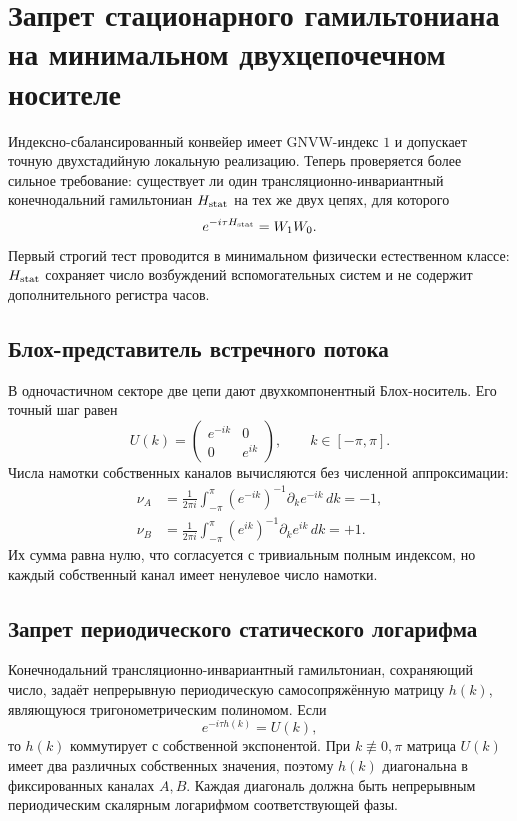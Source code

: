 \chapter{Запрет стационарного гамильтониана на минимальном двухцепочечном носителе}
\label{ch:v8-static-local-hamiltonian-embedding-no-go-gate}

Индексно-сбалансированный конвейер имеет GNVW-индекс $1$ и допускает
точную двухстадийную локальную реализацию. Теперь проверяется более сильное
требование: существует ли один трансляционно-инвариантный конечнодальний
гамильтониан $H_{\rm stat}$ на тех же двух цепях, для которого
\begin{equation}
 e^{-i\tau H_{\rm stat}}=W_1W_0.
\end{equation}
Первый строгий тест проводится в минимальном физически естественном классе:
$H_{\rm stat}$ сохраняет число возбуждений вспомогательных систем и не содержит
дополнительного регистра часов.

\section{Блох-представитель встречного потока}

В одночастичном секторе две цепи дают двухкомпонентный Блох-носитель. Его
точный шаг равен
\begin{equation}
 U(k)=\begin{pmatrix}e^{-ik}&0\\0&e^{ik}\end{pmatrix},
 \qquad k\in[-\pi,\pi].
\end{equation}
Числа намотки собственных каналов вычисляются без численной аппроксимации:
\begin{align}
 \nu_A&=\frac1{2\pi i}\int_{-\pi}^{\pi}
  (e^{-ik})^{-1}\partial_k e^{-ik}\,dk=-1,\\
 \nu_B&=\frac1{2\pi i}\int_{-\pi}^{\pi}
  (e^{ik})^{-1}\partial_k e^{ik}\,dk=+1.
\end{align}
Их сумма равна нулю, что согласуется с тривиальным полным индексом, но
каждый собственный канал имеет ненулевое число намотки.

\section{Запрет периодического статического логарифма}

Конечнодальний трансляционно-инвариантный гамильтониан, сохраняющий число, задаёт
непрерывную периодическую самосопряжённую матрицу $h(k)$, являющуюся
тригонометрическим полиномом. Если
\begin{equation}
 e^{-i\tau h(k)}=U(k),
\end{equation}
то $h(k)$ коммутирует с собственной экспонентой. При
$k\not\equiv0,\pi$ матрица $U(k)$ имеет два различных собственных значения,
поэтому $h(k)$ диагональна в фиксированных каналах $A,B$. Каждая диагональ
должна быть непрерывным периодическим скалярным логарифмом соответствующей
фазы.

